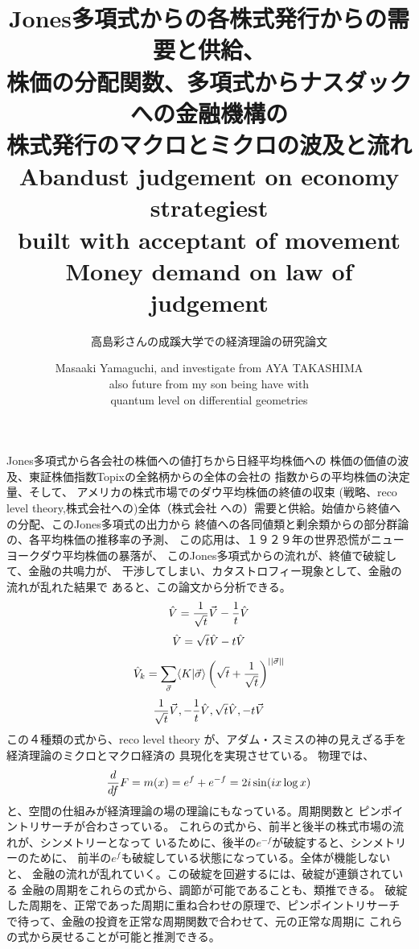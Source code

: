 \documentclass{jsarticle}
\begin{document}
\title{Jones多項式からの各株式発行からの需要と供給、\\
株価の分配関数、多項式からナスダックへの金融機構の \\
株式発行のマクロとミクロの波及と流れ}
\author{高島彩さんの成蹊大学での経済理論の研究論文}

   Jones多項式から各会社の株価への値打ちから日経平均株価への
   株価の価値の波及、東証株価指数Topixの全銘柄からの全体の会社の
   指数からの平均株価の決定量、そして、
   アメリカの株式市場でのダウ平均株価の終値の収束
   (戦略、reco level theory,株式会社への)全体（株式会社
   への）需要と供給。始値から終値への分配、このJones多項式の出力から
   終値への各同値類と剰余類からの部分群論の、各平均株価の推移率の予測、
   この応用は、１９２９年の世界恐慌がニューヨークダウ平均株価の暴落が、
   このJones多項式からの流れが、終値で破綻して、金融の共鳴力が、
   干渉してしまい、カタストロフィー現象として、金融の流れが乱れた結果で
   あると、この論文から分析できる。
   $$ \Hat{V} = {1 \over \sqrt{t}} \vec{V} - {1 \over t}\Hat{V} $$
   $$ \Hat{V} = \sqrt{t}\Hat{V} - t \Hat{V} $$
   $$ \Hat{V}_k = \sum_{\vec{\sigma}} \langle K| \vec{\sigma}\rangle
   \left(\sqrt{t} + {1 \over \sqrt{t}} \right)^{||\vec{\sigma}||} $$
   $$ {1 \over \sqrt{t}}\vec{V}, -{1 \over t}\Hat{V},\\ 
   \sqrt{t}\Hat{V}, -t \vec{V} $$
   この４種類の式から、reco level theory
   が、アダム・スミスの神の見えざる手を経済理論のミクロとマクロ経済の
   具現化を実現させている。
   物理では、$$ {d \over df}F = m(x) = e^f + e^{-f} = 2 i \sin (i x \log x) $$
   と、空間の仕組みが経済理論の場の理論にもなっている。周期関数と
   ピンポイントリサーチが合わさっている。
   これらの式から、前半と後半の株式市場の流れが、シンメトリーとなって
   いるために、後半の$ e^{-f} $が破綻すると、シンメトリーのために、
   前半の$ e^f $も破綻している状態になっている。全体が機能しないと、
   金融の流れが乱れていく。この破綻を回避するには、破綻が連鎖されている
   金融の周期をこれらの式から、調節が可能であることも、類推できる。
   破綻した周期を、正常であった周期に重ね合わせの原理で、ピンポイントリサーチ
   で待って、金融の投資を正常な周期関数で合わせて、元の正常な周期に
   これらの式から戻せることが可能と推測できる。

\title{Abandust judgement on economy strategiest \\
built with acceptant of movement \\
Money demand on law of judgement}
\author{Masaaki Yamaguchi, and investigate from AYA TAKASHIMA \\
also future from my son being have with \\
quantum level on differential geometries}
\end{document}
